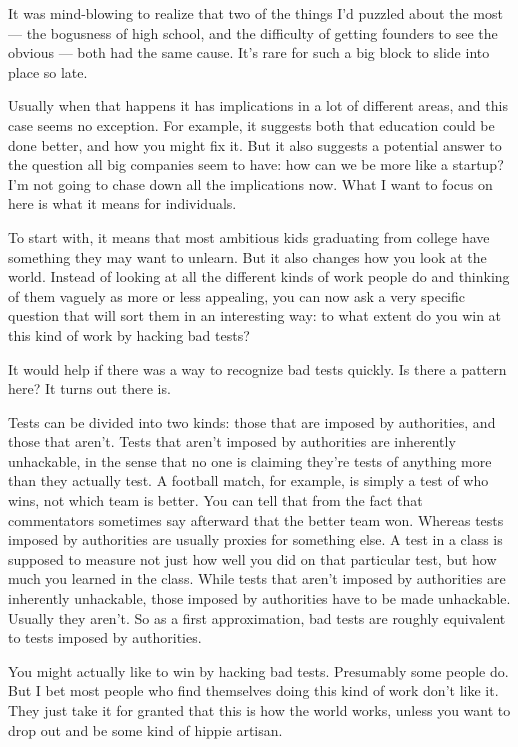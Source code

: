 \documentclass[12pt]{book}
\begin{document}
It was mind-blowing to realize that two of the things I'd puzzled about
the most --- the bogusness of high school, and the difficulty of getting
founders to see the obvious --- both had the same cause. It's rare for
such a big block to slide into place so late.

Usually when that happens it has implications in a lot of different
areas, and this case seems no exception. For example, it suggests both
that education could be done better, and how you might fix it. But it
also suggests a potential answer to the question all big companies seem
to have: how can we be more like a startup? I'm not going to chase down
all the implications now. What I want to focus on here is what it means
for individuals.

To start with, it means that most ambitious kids graduating from college
have something they may want to unlearn. But it also changes how you
look at the world. Instead of looking at all the different kinds of work
people do and thinking of them vaguely as more or less appealing, you
can now ask a very specific question that will sort them in an
interesting way: to what extent do you win at this kind of work by
hacking bad tests?

It would help if there was a way to recognize bad tests quickly. Is
there a pattern here? It turns out there is.

Tests can be divided into two kinds: those that are imposed by
authorities, and those that aren't. Tests that aren't imposed by
authorities are inherently unhackable, in the sense that no one is
claiming they're tests of anything more than they actually test. A
football match, for example, is simply a test of who wins, not which
team is better. You can tell that from the fact that commentators
sometimes say afterward that the better team won. Whereas tests imposed
by authorities are usually proxies for something else. A test in a class
is supposed to measure not just how well you did on that particular
test, but how much you learned in the class. While tests that aren't
imposed by authorities are inherently unhackable, those imposed by
authorities have to be made unhackable. Usually they aren't. So as a
first approximation, bad tests are roughly equivalent to tests imposed
by authorities.

You might actually like to win by hacking bad tests. Presumably some
people do. But I bet most people who find themselves doing this kind of
work don't like it. They just take it for granted that this is how the
world works, unless you want to drop out and be some kind of hippie
artisan.
\end{document}
